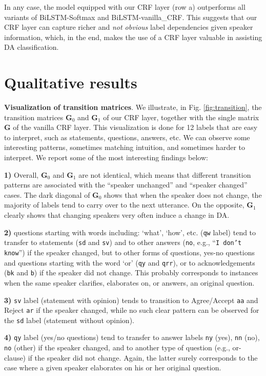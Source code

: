 \documentclass[11pt,a4paper]{article}
\begin{document}
In any case, the model equipped with our CRF layer (row a) outperforms all variants of BiLSTM-Softmax and BiLSTM-vanilla\_CRF.
This suggests that our CRF layer can capture richer and \textit{not obvious} label dependencies given speaker information, which, in the end, makes the use of a CRF layer valuable in assisting DA classification.

\section{Qualitative results}
\noindent \textbf{Visualization of transition matrices}.
We illustrate, in Fig. \ref{fig:transition}, the transition matrices $\mathbf{G}_0$ and $\mathbf{G}_1$ of our CRF layer, together with the single matrix $\mathbf{G}$ of the vanilla CRF layer.
This visualization is done for 12 labels that are easy to interpret, such as statements, questions, answers, etc. 
We can observe some interesting patterns, sometimes matching intuition, and sometimes harder to interpret.
We report some of the most interesting findings below:

\noindent \textbf{1)} Overall, $\mathbf{G}_0$ and $\mathbf{G}_1$ are not identical, which means that different transition patterns are associated with the ``speaker unchanged'' and ``speaker changed'' cases. 
The dark diagonal of $\mathbf{G}_0$ shows that when the speaker does not change, the majority of labels tend to carry over to the next utterance.
On the opposite, $\mathbf{G}_1$ clearly shows that changing speakers very often induce a change in DA.

\noindent \textbf{2)} questions starting with words including: `what', `how', etc. (\texttt{qw} label) tend to transfer to statements (\texttt{sd} and \texttt{sv}) and to other answers (\texttt{no}, e.g., ``{\small\texttt{I don't know}}'') if the speaker changed, but to other forms of questions, yes-no questions and questions starting with the word `or' (\texttt{qy} and \texttt{qrr}), or to acknowledgements (\texttt{bk} and \texttt{b}) if the speaker did not change.
This probably corresponds to instances when the same speaker clarifies, elaborates on, or answers, an original question.


\noindent \textbf{3)} \texttt{sv} label (statement with opinion) tends to transition to Agree/Accept \texttt{aa} and Reject \texttt{ar} if the speaker changed, while no such clear pattern can be observed for the \texttt{sd} label (statement without opinion).

\noindent \textbf{4)} \texttt{qy} label (yes/no questions) tend to transfer to answer labels \texttt{ny} (yes), \texttt{nn} (no), \texttt{no} (other) if the speaker changed, and to another type of question (e.g., or-clause) if the speaker did not change.
Again, the latter surely corresponds to the case where a given speaker elaborates on his or her original question.
\end{document}
